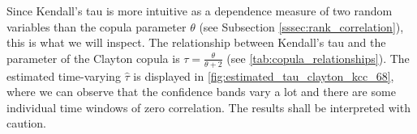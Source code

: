 Since Kendall's tau is more intuitive as a dependence measure of two random variables than the copula parameter $\theta$ (see Subsection \ref{sssec:rank_correlation}), this is what we will inspect. The relationship between Kendall's tau and the parameter of the Clayton copula is $\tau = \frac{\theta}{\theta + 2}$ (see \autoref{tab:copula_relationships}). The estimated time-varying $\hat{\tau}$ is displayed in \autoref{fig:estimated_tau_clayton_kcc_68}, where we can observe that the confidence bands vary a lot and there are some  individual time windows of zero correlation. The results shall be interpreted with caution.


























%
% 
%
%
%
%
%
%

